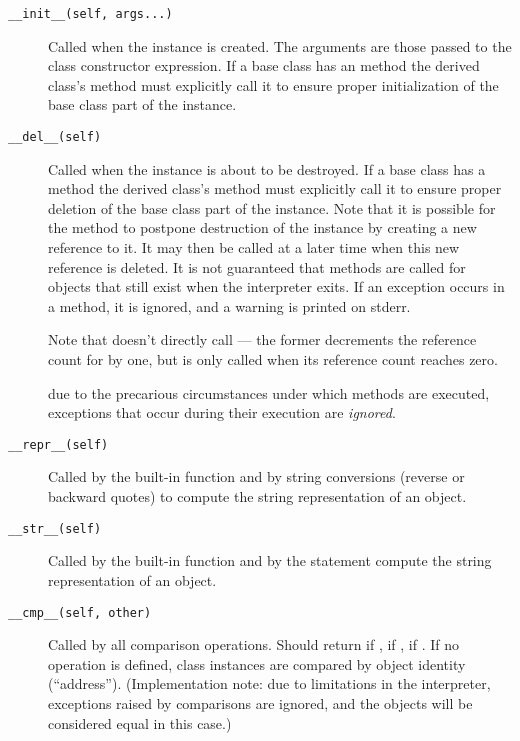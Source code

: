 \begin{description}

\item[{\tt __init__(self, args...)}]
Called when the instance is created.  The arguments are those passed
to the class constructor expression.  If a base class has an
 method the derived class's  method must
explicitly call it to ensure proper initialization of the base class
part of the instance.


\item[{\tt __del__(self)}]
Called when the instance is about to be destroyed.  If a base class
has a  method the derived class's  method
must explicitly call it to ensure proper deletion of the base class
part of the instance.  Note that it is possible for the 
method to postpone destruction of the instance by creating a new
reference to it.  It may then be called at a later time when this new
reference is deleted.  It is not guaranteed that
 methods are called for objects that still exist when
the interpreter exits.
If an exception occurs in a  method, it is ignored, and
a warning is printed on stderr.

Note that  doesn't directly call  --- the
former decrements the reference count for  by one, but
 is only called when its reference count reaches zero.

 due to the precarious circumstances under which
 methods are executed, exceptions that occur during
their execution are \emph{ignored}.

\item[{\tt __repr__(self)}]
Called by the  built-in function and by string conversions
(reverse or backward quotes) to compute the string representation of an object.

\item[{\tt __str__(self)}]
Called by the  built-in function and by the 
statement compute the string representation of an object.

\item[{\tt __cmp__(self, other)}]
Called by all comparison operations.  Should return  if
,   if ,  if
.  If no  operation is defined, class
instances are compared by object identity (``address'').
(Implementation note: due to limitations in the interpreter,
exceptions raised by comparisons are ignored, and the objects will be
considered equal in this case.)


\end{description}
